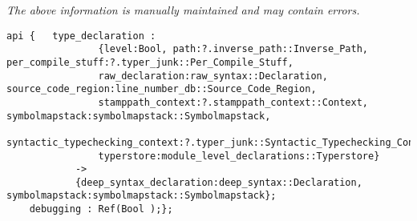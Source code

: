 \label{api:Type\_Package\_Language}

{\tiny \it The above information is manually maintained and may contain errors.}
\begin{verbatim}
api {   type_declaration :
                {level:Bool, path:?.inverse_path::Inverse_Path, per_compile_stuff:?.typer_junk::Per_Compile_Stuff,
                raw_declaration:raw_syntax::Declaration, source_code_region:line_number_db::Source_Code_Region,
                stamppath_context:?.stamppath_context::Context, symbolmapstack:symbolmapstack::Symbolmapstack,
                syntactic_typechecking_context:?.typer_junk::Syntactic_Typechecking_Context,
                typerstore:module_level_declarations::Typerstore}
            ->
            {deep_syntax_declaration:deep_syntax::Declaration, symbolmapstack:symbolmapstack::Symbolmapstack};
    debugging : Ref(Bool );};
\end{verbatim}
